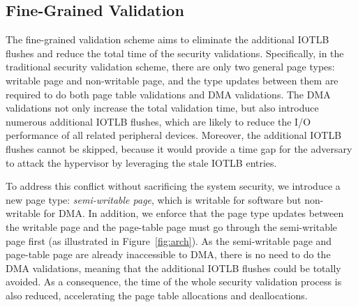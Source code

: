 \subsection{Fine-Grained Validation}\label{sec:fine-grained}
The fine-grained validation scheme aims to eliminate the additional IOTLB flushes and reduce the total time of the security validations.
Specifically, in the traditional security validation scheme, there are only two general page types: writable page and non-writable page, 
and the type updates between them are required to do both page table validations and DMA validations.
The DMA validations not only increase the total validation time, but also introduce numerous additional IOTLB flushes, which are likely to reduce the I/O performance of all related peripheral devices.
Moreover, the additional IOTLB flushes cannot be skipped, because it would provide a time gap for the adversary to attack the hypervisor by leveraging the stale IOTLB entries. 

To address this conflict without sacrificing the system security, we introduce a new page type: \emph{semi-writable page}, which is writable for software but non-writable for DMA.
In addition, we enforce that the page type updates between the writable page and the page-table page must go through the semi-writable page first (as illustrated in Figure~\ref{fig:arch}).
As the semi-writable page and page-table page are already inaccessible to DMA, there is no need to do the DMA validations, meaning that the additional IOTLB flushes could be totally avoided.
As a consequence, the time of the whole security validation process is also reduced, accelerating the page table allocations and deallocations.


